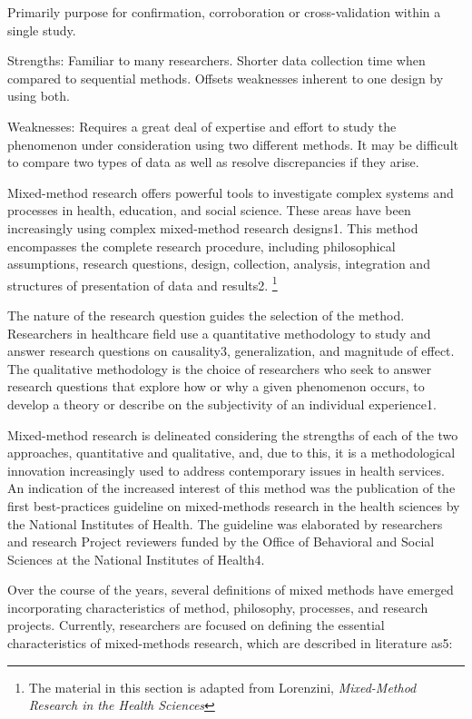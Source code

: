 Primarily purpose for confirmation, corroboration or cross-validation within a single study.

Strengths: Familiar to many researchers. Shorter data collection time when compared to sequential methods. Offsets weaknesses inherent to one design by using both.

Weaknesses: Requires a great deal of expertise and effort to study the phenomenon under consideration using two different methods. It may be difficult to compare two types of data as well as resolve discrepancies if they arise.


Mixed-method research offers powerful tools to investigate complex systems and processes in health, education, and social science. These areas have been increasingly using complex mixed-method research designs1. This method encompasses the complete research procedure, including philosophical assumptions, research questions, design, collection, analysis, integration and structures of presentation of data and results2. \footnote{The material in this section is adapted from Lorenzini, \textit{Mixed-Method Research in the Health Sciences}\cite{lorenzini2017mixed}}

The nature of the research question guides the selection of the method. Researchers in healthcare field use a quantitative methodology to study and answer research questions on causality3, generalization, and magnitude of effect. The qualitative methodology is the choice of researchers who seek to answer research questions that explore how or why a given phenomenon occurs, to develop a theory or describe on the subjectivity of an individual experience1.

Mixed-method research is delineated considering the strengths of each of the two approaches, quantitative and qualitative, and, due to this, it is a methodological innovation increasingly used to address contemporary issues in health services. An indication of the increased interest of this method was the publication of the first best-practices guideline on mixed-methods research in the health sciences by the National Institutes of Health. The guideline was elaborated by researchers and research Project reviewers funded by the Office of Behavioral and Social Sciences at the National Institutes of Health4.

Over the course of the years, several definitions of mixed methods have emerged incorporating characteristics of method, philosophy, processes, and research projects. Currently, researchers are focused on defining the essential characteristics of mixed-methods research, which are described in literature as5:


